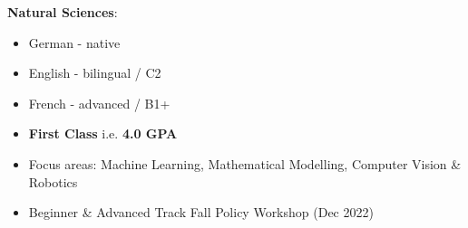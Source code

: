 \documentclass[10pt,a4paper,ragged2e,withhyper]{altacv}
\begin{document}
\begin{paracol}{2}
\textbf{Natural Sciences}:\\
\vspace{3mm}


\begin{itemize}
    \item German - native
    \item English - bilingual / C2
    \item French - advanced / B1+
\end{itemize}




\begin{itemize}
    \item \textbf{First Class} i.e. \textbf{4.0 GPA}
    \item Focus areas: Machine Learning, Mathematical Modelling, Computer Vision \& Robotics
\end{itemize}

\begin{itemize}
    \item Beginner \& Advanced Track  Fall Policy Workshop (Dec 2022)
\end{itemize}

\newpage





\end{paracol}
\end{document}
